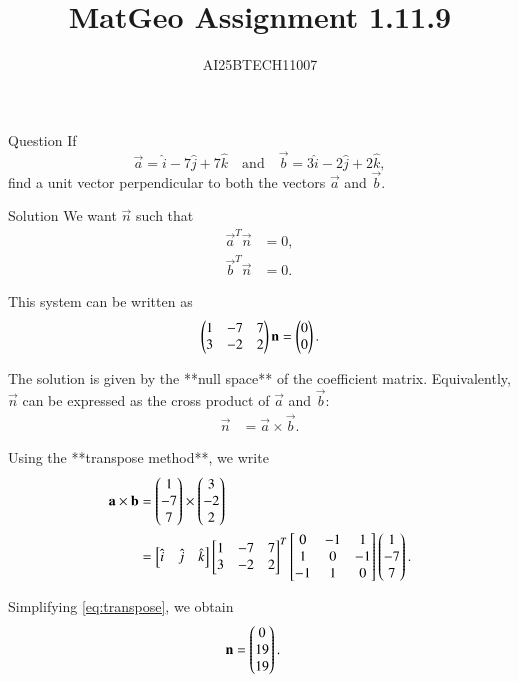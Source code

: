 \documentclass{beamer}
\title 
{MatGeo Assignment 1.11.9}
\author
{AI25BTECH11007}
\begin{document}
\frame{\titlepage}
\begin{frame}{Question}
If
\[
\vec{a} = \hat{i} - 7\hat{j} + 7\hat{k}
\quad \text{and} \quad
\vec{b} = 3\hat{i} - 2\hat{j} + 2\hat{k},
\]
find a unit vector perpendicular to both the vectors $\vec{a}$ and $\vec{b}$.\\
\end{frame}
\begin{frame}{Solution}
We want $\vec{n}$ such that 
\begin{align}
\vec{a}^T \vec{n} &= 0, \label{eq:orth1} \\
\vec{b}^T \vec{n} &= 0. \label{eq:orth2}
\end{align}

This system can be written as
\begin{align}
\begin{pmatrix}
1 & -7 & 7 \\
3 & -2 & 2
\end{pmatrix}
\mathbf{n} = \begin{pmatrix}0 \\ 0\end{pmatrix}.
\end{align}

The solution is given by the **null space** of the coefficient matrix.  
Equivalently, $\vec{n}$ can be expressed as the cross product of $\vec{a}$ and $\vec{b}$:
\begin{align}
\vec{n} &= \vec{a} \times \vec{b}. \label{eq:axb}
\end{align}
\end{frame}
\begin{frame}
Using the **transpose method**, we write
\begin{align}
\mathbf{a} \times \mathbf{b} &= 
\begin{pmatrix}1 \\ -7 \\ 7\end{pmatrix} \times \begin{pmatrix}3 \\ -2 \\ 2\end{pmatrix} \\
&= 
\begin{bmatrix}
\hat{i} & \hat{j} & \hat{k}
\end{bmatrix}
\begin{bmatrix}
1 & -7 & 7 \\
3 & -2 & 2
\end{bmatrix}^T
\begin{bmatrix}
0 & -1 & 1 \\
1 & 0 & -1 \\
-1 & 1 & 0
\end{bmatrix}
\begin{pmatrix}1 \\ -7 \\ 7\end{pmatrix}. \label{eq:transpose}
\end{align}

Simplifying \eqref{eq:transpose}, we obtain
\begin{align}
\mathbf{n} &= \begin{pmatrix}0 \\ 19 \\ 19\end{pmatrix}.
\end{align}
\end{frame}
\end{document}
